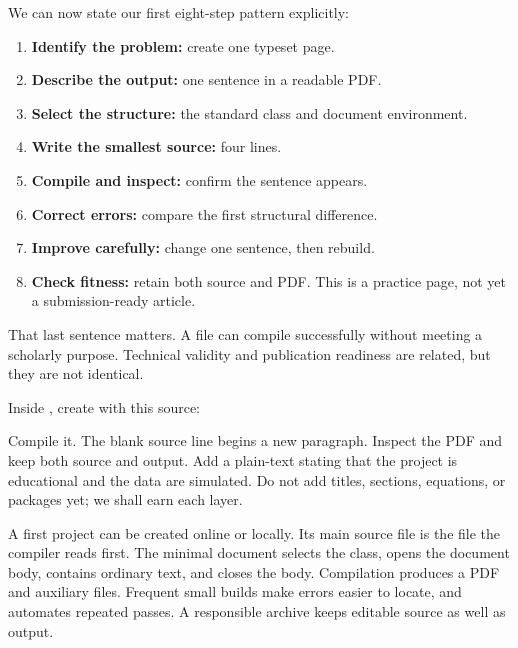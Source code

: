 We can now state our first eight-step pattern explicitly:

\begin{enumerate}
  \item \textbf{Identify the problem:} create one typeset page.
  \item \textbf{Describe the output:} one sentence in a readable PDF.
  \item \textbf{Select the structure:} the standard  class and
        document environment.
  \item \textbf{Write the smallest source:} four lines.
  \item \textbf{Compile and inspect:} confirm the sentence appears.
  \item \textbf{Correct errors:} compare the first structural difference.
  \item \textbf{Improve carefully:} change one sentence, then rebuild.
  \item \textbf{Check fitness:} retain both source and PDF. This is a practice
        page, not yet a submission-ready article.
\end{enumerate}

That last sentence matters. A file can compile successfully without meeting a
scholarly purpose. Technical validity and publication readiness are related,
but they are not identical.

\chapterproject

\begin{miniproject}
Inside , create  with this
source:


Compile it. The blank source line begins a new paragraph. Inspect the PDF and
keep both source and output. Add a plain-text  stating that the
project is educational and the data are simulated. Do not add titles,
sections, equations, or packages yet; we shall earn each layer.
\end{miniproject}

\chaptersummary

A first project can be created online or locally. Its main source file is the
file the compiler reads first. The minimal document selects the
 class, opens the document body, contains ordinary text, and
closes the body. Compilation produces a PDF and auxiliary files. Frequent
small builds make errors easier to locate, and  automates repeated
passes. A responsible archive keeps editable source as well as output.


